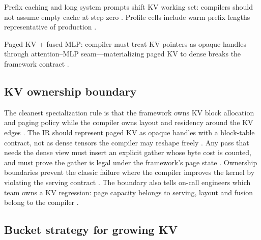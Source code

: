 Prefix caching and long system prompts shift KV working set: compilers should not assume empty cache at step zero \citep{kwon2023vllm,patel2025llminference,yirage2026,chen2020compilerbasedhardw,memoryfloor2026,taxbreak2026,liu2024deepseekv3,amd2024aie,dlbook,dao2022flashattention,dao2023flashdecoding,nvidia2024cudagraphs,nvidia2022hopper,semianalysis2024tma,amd2024xdna}. Profile cells include warm prefix lengths representative of production \citep{patel2025llminference,kwon2023vllm,yirage2026,chen2020compilerbasedhardw,memoryfloor2026,liu2024deepseekv3,taxbreak2026,amd2024aie,dlbook,dao2022flashattention,dao2023flashdecoding,nvidia2024cudagraphs,nvidia2022hopper,semianalysis2024tma,amd2024xdna}.

\begin{example}
Paged KV + fused MLP: compiler must treat KV pointers as opaque handles through attention--MLP seam---materializing paged KV to dense breaks the framework contract \citep{kwon2023vllm,dao2022flashattention,yirage2026,chen2020compilerbasedhardw,patel2025llminference,memoryfloor2026,taxbreak2026,liu2024deepseekv3,amd2024aie,dlbook,dao2023flashdecoding,nvidia2024cudagraphs,nvidia2022hopper,semianalysis2024tma,amd2024xdna}.
\end{example}

\subsection{KV ownership boundary}

The cleanest specialization rule is that the framework owns KV block allocation and paging policy while the compiler owns layout and residency around the KV edges \citep{kwon2023vllm,patel2025llminference,chen2020compilerbasedhardw}. The IR should represent paged KV as opaque handles with a block-table contract, not as dense tensors the compiler may reshape freely \citep{kwon2023vllm,yirage2026,memoryfloor2026}. Any pass that needs the dense view must insert an explicit gather whose byte cost is counted, and must prove the gather is legal under the framework's page state \citep{chen2020compilerbasedhardw,patel2025llminference}. Ownership boundaries prevent the classic failure where the compiler improves the kernel by violating the serving contract \citep{kwon2023vllm,memoryfloor2026}. The boundary also tells on-call engineers which team owns a KV regression: page capacity belongs to serving, layout and fusion belong to the compiler \citep{patel2025llminference,taxbreak2026}.

\subsection{Bucket strategy for growing KV}

